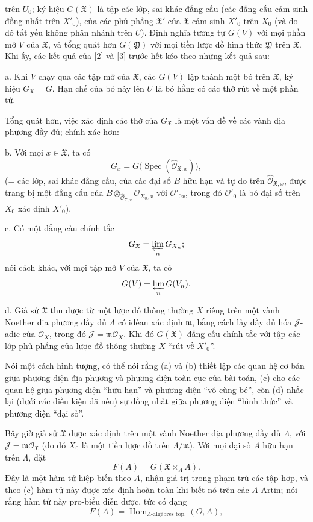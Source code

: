 \documentclass[11pt,twoside,openany]{book}
\numberwithin{equation}{section}
\newcommand{\src}[1]{%
  \phantomsection\hypertarget{src:\fgasourceid:#1}{}%
  \marginpar{\raggedleft\footnotesize\sffamily #1}%
}
\newcommand{\fgasourceid}{unset}
\begin{document}
\src{388}
trên $U_0$; ký hiệu $G(\mathfrak X)$ là tập các lớp, sai khác đẳng cấu (các
đẳng cấu cảm sinh đồng nhất trên $X'_0$), của các phủ phẳng $\mathfrak X'$ của
$\mathfrak X$ cảm sinh $X'_0$ trên $X_0$ (và do đó tất yếu không phân nhánh
trên $U$). Định nghĩa tương tự $G(V)$ với mọi phần mở $V$ của $\mathfrak X$,
và tổng quát hơn $G(\mathfrak Y)$ với mọi tiền lược đồ hình thức
$\mathfrak Y$ trên $\mathfrak X$. Khi ấy, các kết quả của [2] và [3] trước hết
kéo theo những kết quả sau:

\noindent a. Khi $V$ chạy qua các tập mở của $\mathfrak X$, các $G(V)$ lập
thành một bó trên $\mathfrak X$, ký hiệu $G_{\mathfrak X}=G$. Hạn chế của bó
này lên $U$ là bó hằng có các thớ rút về một phần tử.

Tổng quát hơn, việc xác định các thớ của $G_{\mathfrak X}$ là một vấn đề về
các vành địa phương đầy đủ; chính xác hơn:

\noindent b. Với mọi $x\in\mathfrak X$, ta có
\[
  G_x=G\bigl(\operatorname{Spec}(\widehat{\mathcal O}_{\mathfrak X,x})\bigr),
\]
(= các lớp, sai khác đẳng cấu, của các đại số $B$ hữu hạn và tự do trên
$\widehat{\mathcal O}_{\mathfrak X,x}$, được trang bị một đẳng cấu của
$B\otimes_{\widehat{\mathcal O}_{\mathfrak X,x}}\mathcal O_{X_0,x}$ với
$\mathcal O'_{0x}$, trong đó $\mathcal O'_0$ là bó đại số trên $X_0$ xác định
$X'_0$).

\noindent c. Có một đẳng cấu chính tắc
\[
  G_{\mathfrak X}=\varprojlim_nG_{X_n} ;
\]
nói cách khác, với mọi tập mở $V$ của $\mathfrak X$, ta có
\[
  G(V)=\varprojlim_nG(V_n).
\]

\noindent d. Giả sử $\mathfrak X$ thu được từ một lược đồ thông thường $X$
riêng trên một vành Noether địa phương đầy đủ $\Lambda$ có iđêan xác định
$\mathfrak m$, bằng cách lấy đầy đủ hóa $\mathcal J$-adic của $\mathcal O_X$,
trong đó $\mathcal J=\mathfrak m\mathcal O_X$. Khi đó $G(\mathfrak X)$ đẳng
cấu chính tắc với tập các lớp phủ phẳng của lược đồ thông thường $X$ ``rút về
$X'_0$''.

Nói một cách hình tượng, có thể nói rằng (a) và (b) thiết lập các quan hệ cơ
bản giữa phương diện địa phương và phương diện toàn cục của bài toán, (c) cho
các quan hệ giữa phương diện ``hữu hạn'' và phương diện ``vô cùng bé'', còn
(d) nhắc lại (dưới các điều kiện đã nêu) sự đồng nhất giữa phương diện ``hình
thức'' và phương diện ``đại số''.

Bây giờ giả sử $\mathfrak X$ được xác định trên một vành Noether địa phương
đầy đủ $\Lambda$, với $\mathcal J=\mathfrak m\mathcal O_{\mathfrak X}$ (do đó
$X_0$ là một tiền lược đồ trên $\Lambda/\mathfrak m$). Với mọi đại số $A$ hữu
hạn trên $\Lambda$, đặt
\[
  F(A)=G(\mathfrak X\times_\Lambda A).
\]
Đây là một hàm tử hiệp biến theo $A$, nhận giá trị trong phạm trù các tập hợp,
và theo (c) hàm tử này được xác định hoàn toàn khi biết nó trên các $A$ Artin;
nói rằng hàm tử này pro-biểu diễn được, tức có dạng
\[
  F(A)=\operatorname{Hom}_{\Lambda\text{-algèbres top.}}(O,A),
\]
\end{document}
